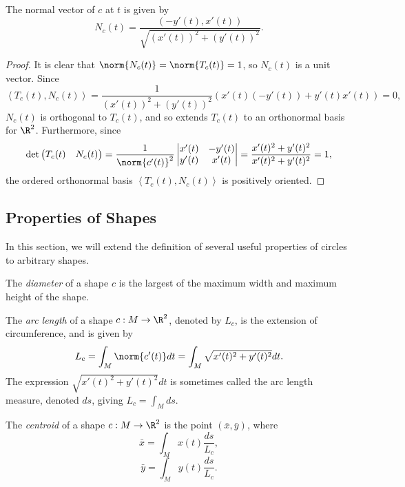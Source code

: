 \documentclass[12pt]{article}
\begin{document}
\begin{prop}
    The normal vector of $c$ at $t$ is given by \[N_c(t) = \frac{(-y'(t), x'(t))}{\sqrt{(x'(t))^2 + (y'(t))^2}}.\]
\end{prop}

\begin{proof}
    It is clear that $\norm{N_c(t)} = \norm{T_c(t)} = 1$, so $N_c(t)$ is a unit vector. Since \[\left\langle T_c(t), N_c(t) \right\rangle = \frac{1}{(x'(t))^2 + (y'(t))^2}\left(x'(t)(-y'(t)) + y'(t)x'(t)\right) = 0,\] $N_c(t)$ is orthogonal to $T_c(t)$, and so extends $T_c(t)$ to an orthonormal basis for $\R^2$. Furthermore, since \[\det\begin{pmatrix}
        T_c(t) & N_c(t)
    \end{pmatrix} = \frac{1}{\norm{c'(t)}^2}\begin{vmatrix}
        x'(t) & -y'(t) \\ y'(t) & x'(t)
    \end{vmatrix} = \frac{x'(t)^2 + y'(t)^2}{x'(t)^2 + y'(t)^2} = 1,\] the ordered orthonormal basis $\left\langle T_c(t), N_c(t) \right\rangle$ is positively oriented.
\end{proof}

\subsection{Properties of Shapes}

In this section, we will extend the definition of several useful properties of circles to arbitrary shapes.

\begin{defn}
    The \emph{diameter} of a shape $c$ is the largest of the maximum width and maximum height of the shape.
\end{defn}

\begin{defn}
    The \emph{arc length} of a shape $c: M \to \R^2$, denoted by $L_c$, is the extension of circumference, and is given by \[L_c = \int_M\norm{c'(t)}dt = \int_M{\sqrt{x'(t)^2 + y'(t)^2}}dt.\] The expression ${\sqrt{x'(t)^2 + y'(t)^2}}dt$ is sometimes called the arc length measure, denoted $ds$, giving $L_c = \int_M ds$.
\end{defn}

\begin{defn}
    The \emph{centroid} of a shape $c: M \to \R^2$ is the point $(\bar{x}, \bar{y})$, where \[\bar{x} = \int_M x(t)\frac{ds}{L_c},\] \[\bar{y} = \int_M y(t)\frac{ds}{L_c}.\]
\end{defn}
\end{document}
